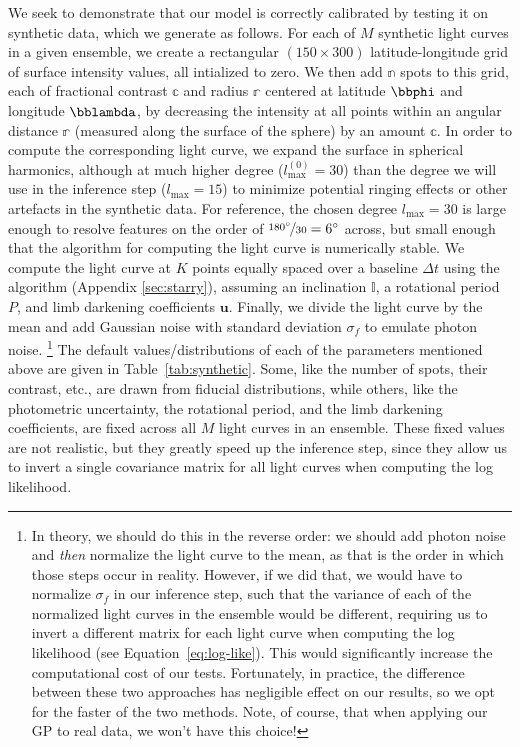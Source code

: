\documentclass[modern]{aastex62}
\begin{document}
We seek to demonstrate that our model is correctly calibrated by testing it
on synthetic data, which we generate as follows. For each of $M$ synthetic
light curves in a given ensemble,
we create a rectangular
$(150 \times 300)$ latitude-longitude grid of surface intensity values, all
intialized
to zero. We then add $\mathbb{n}$ spots to this grid, each of fractional contrast
$\mathbb{c}$ and radius $\mathbb{r}$ centered at latitude $\bbphi$ and longitude $\bblambda$,
by decreasing the intensity at all points within an angular distance $\mathbb{r}$
(measured along the surface of the sphere) by an amount $\mathbb{c}$.
In order to compute the corresponding light curve, we expand the surface
in spherical harmonics, although at much higher degree
($l_\mathrm{max}^{(0)} = 30$)
than the degree we will use in the inference step ($l_\mathrm{max} = 15$)
to minimize potential ringing effects or other artefacts in the synthetic
data. For reference, the chosen degree $l_\mathrm{max} = 30$ is large
enough to resolve features on the order of
$\nicefrac{180^\circ}{30} = 6^\circ$ across, but small enough that
the algorithm for computing the light curve is numerically stable. We
compute the light curve at $K$ points equally spaced over a baseline $\Delta t$
using the \starry algorithm
(Appendix \ref{sec:starry}), assuming an inclination $\mathbb{I}$, a rotational period $P$,
and limb darkening coefficients $\mathbf{u}$. Finally, we divide the
light curve by the mean and add Gaussian noise with standard deviation $\sigma_f$
to emulate photon noise.%
\footnote{
    In theory, we should do this in the reverse order: we should add photon
    noise and \emph{then} normalize the light curve to the mean, as that is the order in which
    those steps occur in reality. However, if we did that, we would have to normalize $\sigma_f$
    in our inference step, such that the variance of each of the normalized light curves
    in the ensemble would be different, requiring us to invert a different matrix for
    each light curve when computing the log likelihood (see Equation~\ref{eq:log-like}).
    This would significantly increase the computational cost of our tests. Fortunately, in
    practice, the difference between these two approaches has negligible effect on
    our results, so we opt for the faster of the two methods. Note, of course,
    that when applying our GP to real data, we won't have this choice!
}
The default values/distributions of each of the parameters mentioned above are given in
Table~\ref{tab:synthetic}. Some, like the number of spots, their contrast,
etc., are drawn from fiducial distributions, while others, like the
photometric uncertainty, the rotational period, and the limb darkening
coefficients,
are fixed across all $M$ light curves in an ensemble. These fixed values
are not realistic, but they greatly speed up the inference step, since they
allow us to invert a single covariance matrix for all light curves when computing
the log likelihood.
\end{document}
